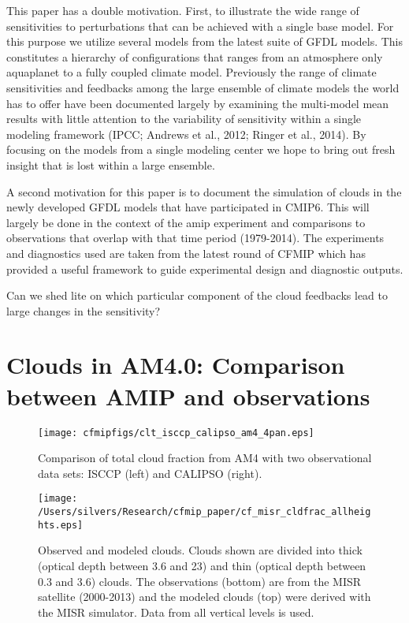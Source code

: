 \documentclass[11pt]{article}   	%
\begin{document}
This paper has a double motivation.  First, to illustrate the wide range of sensitivities to perturbations 
that can be achieved with a single base model.  For this purpose we utilize several models from the latest suite of GFDL 
models.  This constitutes a hierarchy of configurations that ranges from an atmosphere only aquaplanet to a fully coupled 
climate model.  Previously the range of climate sensitivities and feedbacks among the large ensemble of climate models 
the world has to offer have been documented largely by examining the multi-model mean results with little attention to 
the variability of sensitivity within a single modeling framework (IPCC; Andrews et al., 2012; Ringer et al., 2014).  By 
focusing on the models from a single modeling center we hope to bring out fresh insight that is lost within a large ensemble.

A second motivation for this paper is to document the simulation of clouds in the newly developed GFDL models that 
have participated in CMIP6.  This will largely be done in the context of the amip experiment and comparisons to observations
that overlap with that time period (1979-2014).  The experiments and diagnostics used are taken from the latest 
round of CFMIP which has provided a useful framework to guide experimental design and diagnostic outputs.       

Can we shed lite on which particular component of the cloud feedbacks lead to large changes in the sensitivity?  

\section{Clouds in AM4.0: Comparison between AMIP and observations}

\begin{figure}
  \texttt{[image: cfmipfigs/clt\_isccp\_calipso\_am4\_4pan.eps]}
  \caption{Comparison of total cloud fraction from AM4 with two observational data sets: ISCCP (left) and CALIPSO (right).}
  \label{fig:clt_isccp_calipso}
\end{figure}

\begin{figure}
  \texttt{[image: /Users/silvers/Research/cfmip\_paper/cf\_misr\_cldfrac\_allheights.eps]}
  \caption{Observed and modeled clouds.  Clouds shown are divided into thick (optical depth between 3.6 and 23) 
  and thin (optical depth between 0.3 and 3.6) 
  clouds.  The observations (bottom) are from the MISR satellite (2000-2013) and the modeled clouds (top) were 
  derived with the MISR simulator.  Data from all vertical levels is used.}
  \label{fig:misr}
\end{figure}
\end{document}
